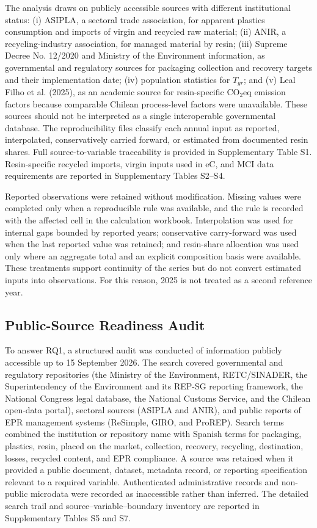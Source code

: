 \documentclass[review,10pt]{elsarticle}
\newcommand{\revpar}[1]{#1\par\medskip}
\begin{document}
\revpar{The analysis draws on publicly accessible sources with different institutional status: (i) ASIPLA, a sectoral trade association, for apparent plastics consumption and imports of virgin and recycled raw material; (ii) ANIR, a recycling-industry association, for managed material by resin; (iii) Supreme Decree No. 12/2020 and Ministry of the Environment information, as governmental and regulatory sources for packaging collection and recovery targets and their implementation date; (iv) population statistics for $T_{gr}$; and (v) Leal Filho et al. (2025), as an academic source for resin-specific CO$_2$eq emission factors because comparable Chilean process-level factors were unavailable. These sources should not be interpreted as a single interoperable governmental database. The reproducibility files classify each annual input as reported, interpolated, conservatively carried forward, or estimated from documented resin shares. Full source-to-variable traceability is provided in Supplementary Table S1. Resin-specific recycled imports, virgin inputs used in eC, and MCI data requirements are reported in Supplementary Tables S2--S4.}

\revpar{Reported observations were retained without modification. Missing values were completed only when a reproducible rule was available, and the rule is recorded with the affected cell in the calculation workbook. Interpolation was used for internal gaps bounded by reported years; conservative carry-forward was used when the last reported value was retained; and resin-share allocation was used only where an aggregate total and an explicit composition basis were available. These treatments support continuity of the series but do not convert estimated inputs into observations. For this reason, 2025 is not treated as a second reference year.}

\subsection{Public-Source Readiness Audit}

\revpar{To answer RQ1, a structured audit was conducted of information publicly accessible up to 15 September 2026. The search covered governmental and regulatory repositories (the Ministry of the Environment, RETC/SINADER, the Superintendency of the Environment and its REP-SG reporting framework, the National Congress legal database, the National Customs Service, and the Chilean open-data portal), sectoral sources (ASIPLA and ANIR), and public reports of EPR management systems (ReSimple, GIRO, and ProREP). Search terms combined the institution or repository name with Spanish terms for packaging, plastics, resin, placed on the market, collection, recovery, recycling, destination, losses, recycled content, and EPR compliance. A source was retained when it provided a public document, dataset, metadata record, or reporting specification relevant to a required variable. Authenticated administrative records and non-public microdata were recorded as inaccessible rather than inferred. The detailed search trail and source--variable--boundary inventory are reported in Supplementary Tables S5 and S7.}
\end{document}
